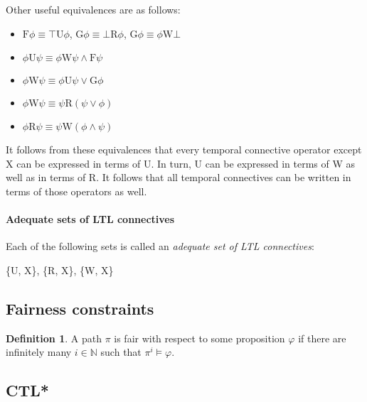\documentclass[10pt,a4paper]{article}
\theoremstyle{definition}
\newtheorem{definition}{Definition}[section]
\begin{document}
Other useful equivalences are as follows:

\begin{itemize}
	\item $\text{F} \phi \equiv \top \text{U} \phi$, $\text{G} \phi \equiv \bot \text{R} \phi$, $\text{G} \phi \equiv \phi \text{W} \bot$
	\item $\phi \text{U} \psi \equiv \phi \text{W} \psi \land \text{F} \psi$
	\item $\phi \text{W} \psi \equiv \phi \text{U} \psi \lor \text{G} \phi$
	\item $\phi \text{W} \psi \equiv \psi \text{R} (\psi \lor \phi)$
	\item $\phi \text{R} \psi \equiv \psi \text{W} (\phi \land \psi)$
\end{itemize}

It follows from these equivalences that every temporal connective operator except X can be expressed in terms of U. In turn, U can be expressed in terms of W as well as in terms of R. It follows that all temporal connectives can be written in terms of those operators as well.

\paragraph{Adequate sets of LTL connectives} Each of the following sets is called an \textit{adequate set of LTL connectives}:
\begin{center}
\{U, X\}, \{R, X\}, \{W, X\}
\end{center}

\subsection{Fairness constraints}

\begin{definition}
A path $\pi$ is fair with respect to some proposition $\varphi$ if there are infinitely many $i \in \mathbb{N}$ such that $\pi^i \models \varphi$.
\end{definition}

\subsection{CTL*}
\end{document}
